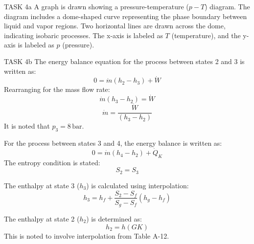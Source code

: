 TASK 4a  
A graph is drawn showing a pressure-temperature (\(p-T\)) diagram. The diagram includes a dome-shaped curve representing the phase boundary between liquid and vapor regions. Two horizontal lines are drawn across the dome, indicating isobaric processes. The x-axis is labeled as \(T\) (temperature), and the y-axis is labeled as \(p\) (pressure).  

TASK 4b  
The energy balance equation for the process between states 2 and 3 is written as:  
\[
0 = \dot{m} (h_2 - h_3) + \dot{W}
\]  
Rearranging for the mass flow rate:  
\[
\dot{m} (h_3 - h_2) = \dot{W}
\]  
\[
\dot{m} = \frac{\dot{W}}{(h_3 - h_2)}
\]  
It is noted that \(p_3 = 8 \, \text{bar}\).  

For the process between states 3 and 4, the energy balance is written as:  
\[
0 = \dot{m} (h_4 - h_2) + \dot{Q}_K
\]  
The entropy condition is stated:  
\[
S_2 = S_3
\]  

The enthalpy at state 3 (\(h_3\)) is calculated using interpolation:  
\[
h_3 = h_f + \frac{S_2 - S_f}{S_g - S_f} (h_g - h_f)
\]  

The enthalpy at state 2 (\(h_2\)) is determined as:  
\[
h_2 = h(GK)
\]  
This is noted to involve interpolation from Table A-12.